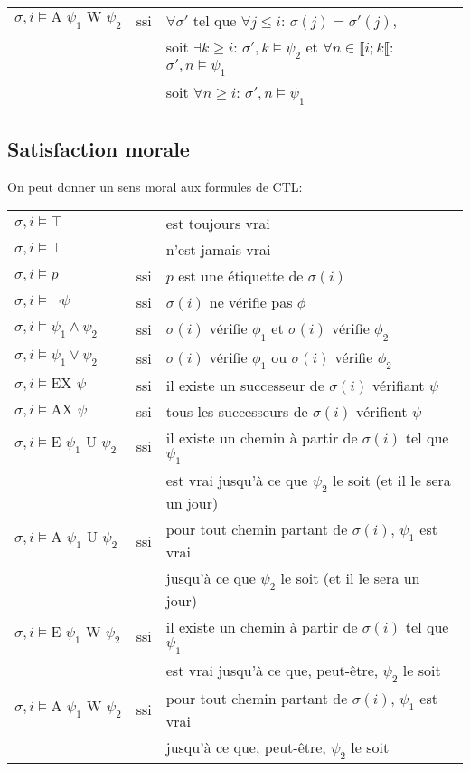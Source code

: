 \documentclass[10pt,a4paper]{article}
\begin{document}
\begin{tabular}{lcl}
$\sigma,i \vDash \mbox{A } \psi_1 \mbox{ W } \psi_2$ &ssi& $\forall \sigma'$ tel que $\forall j \leq i$: $\sigma(j) = \sigma'(j)$, \\
& & soit $\exists k \geq i$: $\sigma',k\vDash \psi_2$ et $\forall n \in \llbracket i; k \llbracket$: $\sigma',n \vDash \psi_1$\\
& & soit $\forall n \geq i$: $\sigma',n \vDash \psi_1$\\
\end{tabular}

\subsection{Satisfaction morale}
On peut donner un sens moral aux formules de CTL:\\

\begin{tabular}{lcl}
$\sigma,i \vDash \top$ && est toujours vrai\\
$\sigma,i \vDash \bot$ && n'est jamais vrai\\
$\sigma,i \vDash p$ &ssi& $p$ est une étiquette de $\sigma(i)$\\
$\sigma,i \vDash \neg \psi$ &ssi& $\sigma(i)$ ne vérifie pas $\phi$\\
$\sigma,i \vDash \psi_1 \land \psi_2$ &ssi& $\sigma(i)$ vérifie $\phi_1$ et $\sigma(i)$ vérifie $\phi_2$\\
$\sigma,i \vDash \psi_1 \lor \psi_2$ &ssi& $\sigma(i)$ vérifie $\phi_1$ ou $\sigma(i)$ vérifie $\phi_2$\\
$\sigma,i \vDash \mbox{EX } \psi$ &ssi& il existe un successeur de $\sigma(i)$ vérifiant $\psi$\\
$\sigma,i \vDash \mbox{AX } \psi$ &ssi& tous les successeurs de $\sigma(i)$ vérifient $\psi$\\
$\sigma,i \vDash \mbox{E } \psi_1 \mbox{ U } \psi_2$ &ssi& il existe un chemin à partir de $\sigma(i)$ tel que $\psi_1$\\&& est vrai jusqu'à ce que $\psi_2$ le soit (et il le sera un jour)\\

$\sigma,i \vDash \mbox{A } \psi_1 \mbox{ U } \psi_2$ &ssi& pour tout chemin partant de $\sigma(i)$, $\psi_1$ est vrai \\&& jusqu'à ce que $\psi_2$ le soit (et il le sera un jour)\\

$\sigma,i \vDash \mbox{E } \psi_1 \mbox{ W } \psi_2$ &ssi& il existe un chemin à partir de $\sigma(i)$ tel que $\psi_1$\\&& est vrai jusqu'à ce que, peut-être, $\psi_2$ le soit\\

$\sigma,i \vDash \mbox{A } \psi_1 \mbox{ W } \psi_2$ &ssi& pour tout chemin partant de $\sigma(i)$, $\psi_1$ est vrai \\&& jusqu'à ce que, peut-être, $\psi_2$ le soit\\
\end{tabular}
\end{document}
